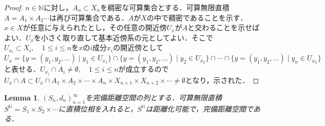 \documentclass[dvipdfmx,autodetect-engine]{jsarticle}
\newtheorem{lemma}[theorem]{Lemma}
\theoremstyle{remark}
\theoremstyle{definition}
\begin{document}
    
    \begin{proof}
    $n \in \mathbb{N}$に対し，$A_n \subset X_n$を稠密な可算集合とする．可算無限直積$A = A_1 \times A_2 \cdots$は再び可算集合である．$A$が$X$の中で稠密であることを示す．$x \in X$が任意に与えられたとし，その任意の開近傍$U_x$が$A$と交わることを示せばよい．$U_x$を小さく取り直して基本近傍系の元としてよい．そこで$U_{x_i} \subset X_i ,\quad 1\leq i \leq n$を$x$の$i$成分$x_i$の開近傍として$U_x = \{y=(y_1,y_2,\ldots)  \mid y_1 \in U_{x_1} \} \cap \{y=(y_1,y_2,\ldots) \mid y_2 \in U_{x_2} \} \cap \cdots \cap \{y=(y_1,y_2,\ldots) \mid y_n \in U_{x_n} \}$と表せる．$U_{x_i} \cap A_i \neq \emptyset, \quad 1\leq i\leq n$が成立するので$U_x \cap A \subset U_x \cap A_1 \times A_2 \times \cdots \times A_n \times X_{n+1} \times X_{n+2} \times \cdots \neq \emptyset$となり，示された．
    \end{proof}
    
    
    \begin{lemma}\label{prod_complete_met}
    $(S_n,d_n)_{n=1}^{\infty}$を完備距離空間の列とする．可算無限直積$S^{\mathbb{N}} = S_1 \times S_2 \times \cdots$に直積位相を入れると，$S^{\mathbb{N}}$は距離化可能で，完備距離空間である．
    \end{lemma}
    
\end{document}
